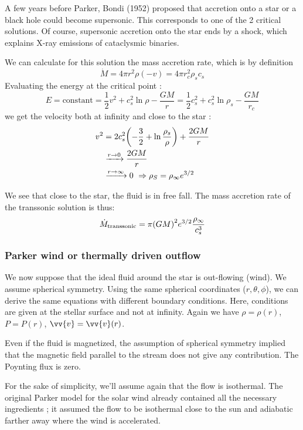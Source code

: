 \documentclass[10pt,a4paper,english,draft]{article}
\let\originalleft\left
\let\originalright\right
\renewcommand{\left}{\mathopen{}\mathclose\bgroup\originalleft}
\renewcommand{\right}{\aftergroup\egroup\originalright}
\begin{document}
A few years before Parker, Bondi (1952) proposed that accretion onto a star or a black hole could become supersonic. This corresponds to one of the 2 critical solutions. Of course, supersonic accretion onto the star ends by a shock, which explains X-ray emissions of cataclysmic binaries.

We can calculate for this solution the mass accretion rate, which is by definition
\begin{equation}
  \dot{M} = 4\pi r^2 \rho (-v) = 4\pi r_c^2 \rho_s c_s
\end{equation}
Evaluating the energy at the critical point :
\begin{equation}
  E = \textrm{constant} = \frac{1}{2}v^2 + c_s^2 \ln\rho - \frac{GM}{r} = \frac{1}{2}c_s^2 + c_s^2 \ln \rho_s - \frac{GM}{r_c}
\end{equation}
we get the velocity both at infinity and close to the star :
\begin{align}
  v^2 &= 2c_s^2 \left( -\frac{3}{2} + \ln \frac{\rho_s}{\rho} \right)  + \frac{2GM}{r} \\
      & \xrightarrow{r\to 0} \frac{2GM}{r} \\
      & \xrightarrow{r\to\infty} 0\ \Rightarrow \rho_S = \rho_\infty e^{3/2}
\end{align}

We see that close to the star, the fluid is in free fall. The mass accretion rate of the transsonic solution is thus:
\begin{equation}
  \dot{M}_\mathrm{transsonic} = \pi \left( GM \right)^2 e^{3/2} \frac{\rho_\infty}{c_s^3}
\end{equation}
\subsubsection{Parker wind or thermally driven outflow}
We now suppose that the ideal fluid around the star is out-flowing (wind). We assume spherical symmetry. Using the same spherical coordinates ($r, \theta, \phi$), we can derive the same equations with different boundary conditions. Here, conditions are given at the stellar surface and not at infinity. Again we have $\rho = \rho(r)$, $P = P(r)$, $\vv{v} = \vv{v}(r)$.

Even if the fluid is magnetized, the assumption of spherical symmetry implied that the magnetic field parallel to the stream does not give any contribution. The Poynting flux is zero.

For the sake of simplicity, we'll assume again that the flow is isothermal. The original Parker model for the solar wind already contained all the necessary ingredients ; it assumed the flow to be isothermal close to the sun and adiabatic farther away where the wind is accelerated.
\end{document}
